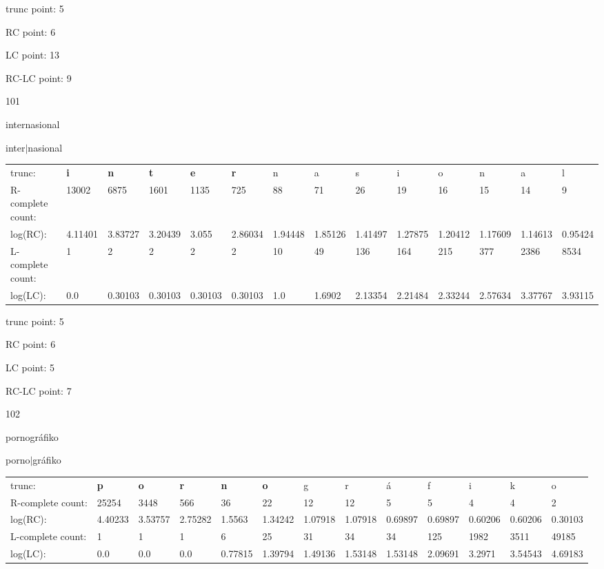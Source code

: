 \documentclass{article}
\begin{document}
trunc point: 5

RC point: 6

LC point: 13

RC-LC point: 9

\vspace{3em}



101

internasional

inter$|$nasional

\vspace{1em}

\begin{tabular}{l|lllllllllllll}

trunc: & {\color{red}\bf i} & {\color{red}\bf n} & {\color{red}\bf t} & {\color{red}\bf e} & {\color{red}\bf r} & n & a & s & i & o & n & a & l \\ 
R-complete count: & 13002 & 6875 & 1601 & 1135 & 725 & 88 & 71 & 26 & 19 & 16 & 15 & 14 & 9 \\ 
log(RC): & 4.11401 & 3.83727 & 3.20439 & 3.055 & 2.86034 & 1.94448 & 1.85126 & 1.41497 & 1.27875 & 1.20412 & 1.17609 & 1.14613 & 0.95424 \\ 
L-complete count: & 1 & 2 & 2 & 2 & 2 & 10 & 49 & 136 & 164 & 215 & 377 & 2386 & 8534 \\ 
log(LC): & 0.0 & 0.30103 & 0.30103 & 0.30103 & 0.30103 & 1.0 & 1.6902 & 2.13354 & 2.21484 & 2.33244 & 2.57634 & 3.37767 & 3.93115 \\ 
\end{tabular}

trunc point: 5

RC point: 6

LC point: 5

RC-LC point: 7

\vspace{3em}



102

pornográfiko

porno$|$gráfiko

\vspace{1em}

\begin{tabular}{l|llllllllllll}

trunc: & {\color{red}\bf p} & {\color{red}\bf o} & {\color{red}\bf r} & {\color{red}\bf n} & {\color{red}\bf o} & g & r & á & f & i & k & o \\ 
R-complete count: & 25254 & 3448 & 566 & 36 & 22 & 12 & 12 & 5 & 5 & 4 & 4 & 2 \\ 
log(RC): & 4.40233 & 3.53757 & 2.75282 & 1.5563 & 1.34242 & 1.07918 & 1.07918 & 0.69897 & 0.69897 & 0.60206 & 0.60206 & 0.30103 \\ 
L-complete count: & 1 & 1 & 1 & 6 & 25 & 31 & 34 & 34 & 125 & 1982 & 3511 & 49185 \\ 
log(LC): & 0.0 & 0.0 & 0.0 & 0.77815 & 1.39794 & 1.49136 & 1.53148 & 1.53148 & 2.09691 & 3.2971 & 3.54543 & 4.69183 \\ 
\end{tabular}
\end{document}
